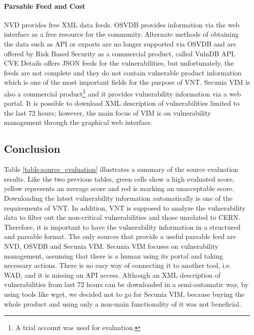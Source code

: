     
    
    
    
\paragraph{Parsable Feed and Cost}
NVD provides free XML data feeds. OSVDB provides information via the web interface as a free resource for the community. Alternate methods of obtaining the data such as API or exports are no longer supported via OSVDB and are offered by Risk Based Security as a commercial product, called VulnDB API. CVE Details offers JSON feeds for the vulnerabilities, but unfortunately, the feeds are not complete and they do not contain vulnerable product information which is one of the most important fields for the purpose of VNT. Secunia VIM is also a commercial product\footnote{A trial account was used for evaluation.} and it provides vulnerability information via a web portal. It is possible to download XML description of vulnerabilities limited to the last 72 hours; however, the main focus of VIM is on vulnerability management through the graphical web interface. 
    
    
    
    
 

\subsection{Conclusion}
Table \ref{table:source_evaluation} illustrates a summary of the source evaluation results. Like the two previous tables, green cells show a high evaluated score, yellow represents an average score and red is marking an unacceptable score. Downloading the latest vulnerability information automatically is one of the requirements of VNT. In addition, VNT is supposed to analyze the vulnerability data to filter out the non-critical vulnerabilities and those unrelated to CERN. Therefore, it is important to have the vulnerability information in a structured and parsable format. 
The only sources that provide a useful parsable feed are NVD, OSVDB and Secunia VIM. Secunia VIM focuses on vulnerability management, assuming that there is a human using its portal and taking necessary actions. There is no easy way of connecting it to another tool, i.e. WAD, and it is missing an API access. Although an XML description of vulnerabilities from last 72 hours can be downloaded in a semi-automatic way, by using tools like wget, we decided not to go for Secunia VIM, because buying the whole product and using only a non-main functionality of it was not beneficial.
